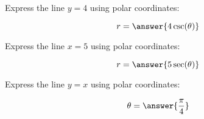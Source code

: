 \documentclass{ximera}
\author{Jim Talamo }
\begin{document}
\begin{exercise}

Express the line $y= 4$ using polar coordinates:

\[
r= \answer{4\csc(\theta)}
\]

Express the line $x=5$ using polar coordinates:

\[
r= \answer{5\sec(\theta)}
\]

Express the line $y=x$ using polar coordinates:

\[
\theta= \answer{\frac{\pi}{4}}
\]

\end{exercise}
\end{document}
